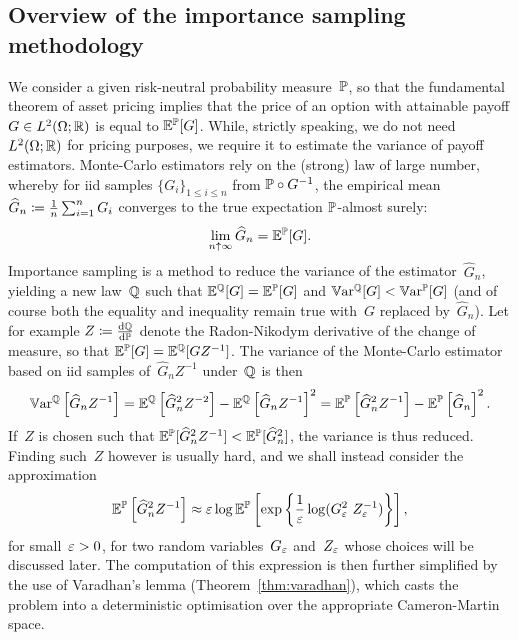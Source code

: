 \subsection{Overview of the importance sampling methodology}
We consider a given risk-neutral probability measure~$\mathbb{P}$, so that
the fundamental theorem of asset pricing
implies that the price of an option with  attainable payoff $G\in L^2( \Omega;\mathbb{R})$ is equal to $\mathbb{E}^{\mathbb{P}}[G]$. 
While, strictly speaking, 
we do not need $L^2(\Omega;\mathbb{R})$ for pricing purposes, we require it to estimate the variance of payoff estimators.
Monte-Carlo estimators rely on the (strong) law of large number, whereby for iid samples $\{G_{i}\}_{1\leq i \leq n}$ from $\mathbb{P} \circ G^{-1}$, 
the empirical mean $\widehat{G}_n \coloneqq\frac{1}{n}\sum_{i=1}^{n}G_i$
converges to the true expectation $\mathbb{P}$-almost surely:
$$
\lim_{n\uparrow \infty}\widehat{G}_n = \mathbb{E}^{\mathbb{P}}[G].
$$
Importance sampling is a method to reduce the variance of the estimator~$\widehat{G}_n$, yielding a new law~$\mathbb{Q}$ such that $\mathbb{E}^{\mathbb{Q}}[G] = \mathbb{E}^{\mathbb{P}}[G]$
and $ \mathbb{V}\mathrm{ar}^{\mathbb{Q}}[G] <  \mathbb{V}\mathrm{ar}^{\mathbb{P}}[G]$
(and of course both the equality and inequality remain true with~$G$ replaced by~$\widehat{G}_n$).
Let for example $Z \coloneqq \frac{\mathrm{d}\mathbb{Q}}{\mathrm{d}\mathbb{P}}$ denote the Radon-Nikodym derivative of the change of measure, so that
$\mathbb{E}^{\mathbb{P}}[G] = \mathbb{E}^{\mathbb{Q}}[G Z^{-1}]$.								 
The variance of the Monte-Carlo estimator based on iid samples of~$\widehat{G}_n Z^{-1}$ under~$\mathbb{Q}$ is then
$$
 \mathbb{V}\mathrm{ar}^{\mathbb{Q}}\left[\widehat{G}_n Z^{-1}\right] 
 = \mathbb{E}^{\mathbb{Q}}\left[\widehat{G}_n^2 Z^{-2}\right]  - \mathbb{E}^{\mathbb{Q}}\left[\widehat{G}_n Z^{-1}\right]^2
 = \mathbb{E}^{\mathbb{P}}\left[\widehat{G}_n^2 Z^{-1}\right]  - \mathbb{E}^{\mathbb{P}}\left[\widehat{G}_n\right]^2.
$$
If~$Z$ is chosen such that $\mathbb{E}^{\mathbb{P}}[\widehat{G}_n^2 Z^{-1}] < \mathbb{E}^{\mathbb{P}}[\widehat{G}_n^2]$, 
the variance is thus reduced.
Finding such~$Z$ however is usually hard, and  
we shall instead consider the approximation
\begin{equation}\label{eq:proxy}
\mathbb{E}^{\mathbb{P}}\left[\widehat{G}_n^2 Z^{-1}\right]
\approx \varepsilon\log \mathbb{E}^{\mathbb{P}}\left[\exp\left\{\frac{1}{\varepsilon}\log(G_{\varepsilon}^2 \ Z_{\varepsilon}^{-1})\right\}\right], 
\end{equation}
for small~$\varepsilon>0$, for two random variables~$G_{\varepsilon}$ and~$Z_{\varepsilon}$ whose choices will be discussed later.
The computation of this expression is then further simplified by the use of Varadhan's lemma (Theorem~\ref{thm:varadhan}), which casts the problem into a deterministic optimisation over the appropriate Cameron-Martin space.


